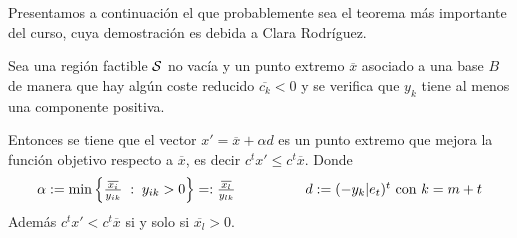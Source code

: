 Presentamos a continuación el que probablemente sea el teorema más importante del curso, cuya demostración es debida a Clara Rodríguez.
\begin{theo}
	Sea una región factible $\mathcal{S}$ no vacía y un punto extremo $\overline{x}$ asociado a una base $B$ de manera que hay algún coste reducido $\overline{c_k}<0$ y se verifica que $y_k$ tiene al menos una componente positiva.
	
	Entonces se tiene que el vector $x'=\overline{x}+\alpha d$ es un punto extremo que mejora la función objetivo respecto a $\overline{x}$, es decir $c^tx'\leq c^t\overline{x}$. Donde
	\begin{equation*}
	\begin{array}{cc}
	\alpha:=\min\left\{\frac{\overline{x_i}}{y_{ik}}\;:\; y_{ik}>0\right\}=:\frac{\overline{x_l}}{y_{lk}} \qquad&\qquad d:=(-y_k|e_t)^t\text{ con } k=m+t
	\end{array}
	\end{equation*}
	Además $c^tx'< c^t\overline{x}$ si y solo si $\overline{x_l}>0$.
\end{theo}
